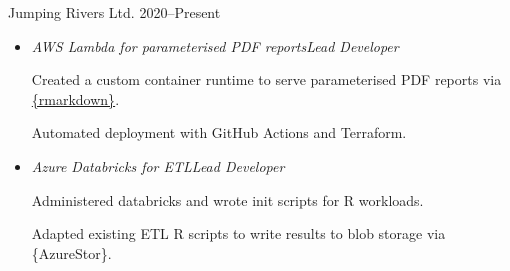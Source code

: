 \documentclass[12pt, a4paper]{article}
\begin{document}

\makecard





%
        {Jumping Rivers Ltd.}%
        {2020--Present}

\vspace{-1em}


\begin{itemize}[
    itemsep=.05em,
    labelwidth=2em,
    leftmargin=1.5em,
    topsep=0em]

    \item[]  
                   {\emph{AWS Lambda for parameterised PDF reports\hfill{}Lead Developer}

                    Created a custom container runtime to serve parameterised PDF reports via
                    \href{https://rmarkdown.rstudio.com/}{\{rmarkdown\}}.

                    Automated deployment with GitHub Actions and Terraform.}%

    \item[]  
                   {\emph{Azure Databricks for ETL\hfill{}Lead Developer}

                    Administered databricks and wrote init scripts for R workloads.

                    Adapted existing ETL R scripts to write results to blob storage via
                    \{AzureStor\}.
                   }

\end{itemize}

\vspace{-.75em}

\end{document}
